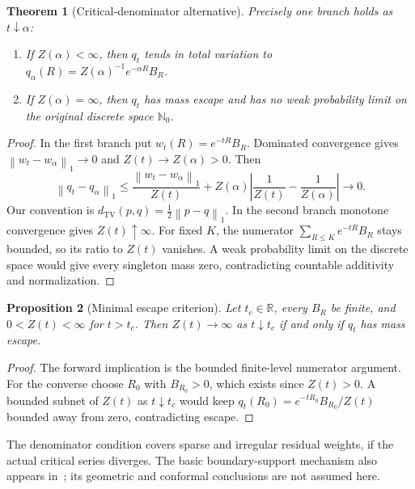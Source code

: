 \documentclass[11pt]{article}
\newtheorem{theorem}{Theorem}[section]
\newtheorem{proposition}[theorem]{Proposition}
\theoremstyle{definition}
\newcommand{\N}{\mathbb N_0}
\newcommand{\R}{\mathbb R}
\newcommand{\norm}[1]{\left\lVert#1\right\rVert}
\begin{document}
\begin{theorem}[Critical-denominator alternative]
\label{thm:alternative}
Precisely one branch holds as $t\downarrow\alpha$:
\begin{enumerate}
\item If $Z(\alpha)<\infty$, then $q_t$ tends in total variation to
$q_\alpha(R)=Z(\alpha)^{-1}e^{-\alpha R}B_R$.
\item If $Z(\alpha)=\infty$, then $q_t$ has mass escape and has no weak probability limit on the original discrete space $\N$.
\end{enumerate}
\end{theorem}
\begin{proof}
In the first branch put $w_t(R)=e^{-tR}B_R$.
Dominated convergence gives $\norm{w_t-w_\alpha}_1\to0$ and $Z(t)\to Z(\alpha)>0$.
Then
\begin{equation}
 \norm{q_t-q_\alpha}_1\leq
 \frac{\norm{w_t-w_\alpha}_1}{Z(t)}
 +Z(\alpha)\left|\frac1{Z(t)}-\frac1{Z(\alpha)}\right|\longrightarrow0.
\end{equation}
Our convention is $d_{\mathrm{TV}}(p,q)=\frac12\norm{p-q}_1$.
In the second branch monotone convergence gives $Z(t)\uparrow\infty$.
For fixed $K$, the numerator $\sum_{R\leq K}e^{-tR}B_R$ stays bounded, so its ratio to $Z(t)$ vanishes.
A weak probability limit on the discrete space would give every singleton mass zero, contradicting countable additivity and normalization.
\end{proof}

\begin{proposition}[Minimal escape criterion]
\label{prop:minimal}
Let $t_c\in\R$, every $B_R$ be finite, and $0<Z(t)<\infty$ for $t>t_c$.
Then $Z(t)\to\infty$ as $t\downarrow t_c$ if and only if $q_t$ has mass escape.
\end{proposition}
\begin{proof}
The forward implication is the bounded finite-level numerator argument.
For the converse choose $R_0$ with $B_{R_0}>0$, which exists since $Z(t)>0$.
A bounded subnet of $Z(t)$ as $t\downarrow t_c$ would keep
$q_t(R_0)=e^{-tR_0}B_{R_0}/Z(t)$ bounded away from zero, contradicting escape.
\end{proof}

The denominator condition covers sparse and irregular residual weights, if the actual critical series diverges.
The basic boundary-support mechanism also appears in~\cite[Section 3]{Patterson1976}; its geometric and conformal conclusions are not assumed here.
\end{document}
